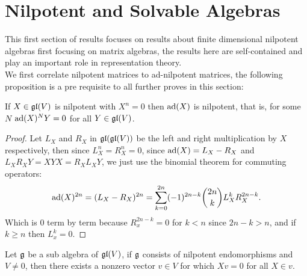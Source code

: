 \section{Nilpotent and Solvable Algebras}
This first section of results focuses on results about finite dimensional nilpotent algebras first focusing on matrix algebras, the results here are self-contained and play an important role in representation theory.\\
We first correlate nilpotent matrices to ad-nilpotent matrices, the following proposition is a pre requisite to all further proves in this section:
\begin{prop}
If $X \in \mathfrak{gl}(V)$ is nilpotent with $X^n=0$ then $\text{ad}(X)$ is nilpotent, that is, for some $N$ $\text{ad}(X)^NY = 0$ for all $Y \in \mathfrak{gl}(V)$.
\label{propadnilpotency}
\end{prop}
\begin{proof}
Let $L_X$ and $R_X$ in $\mathfrak{gl}(\mathfrak{gl}(V))$ be the left and right multiplication by $X$ respectively, then since $L_X^n = R_X^n = 0$, since $\text{ad}(X) = L_X - R_X$ and $L_XR_XY = XYX = R_XL_XY$, we just use the binomial theorem for commuting operators:
$$\text{ad}(X)^{2n} = (L_X-R_X)^{2n} = \sum_{k=0}^{2n} (-1)^{2n-k}{2n \choose k} L_X^{k} R_X^{2n-k}.$$
Which is $0$ term by term because $R_x^{2n-k}=0$ for $k<n$ since $2n-k>n$, and if $k\ge n$ then $L_x^k=0$.
\end{proof}
\begin{teo}
	 Let $\mathfrak{g}$ be a sub algebra of $\mathfrak{gl}(V)$, if $\mathfrak{g}$ consists of nilpotent endomorphisms and $V\not=0$, then there exists a nonzero vector $v \in V$ for which $Xv=0$ for all $X \in v$.
	 \label{Engel's Lemma}
\end{teo}
